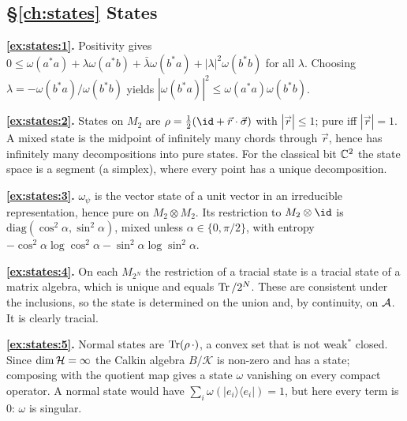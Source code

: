 {\subsection*{\S\ref{ch:states} States}
\textbf{\ref{ex:states:1}.} Positivity gives $0\le\omega(a^*a)+\lambda\omega(a^*b)+\bar\lambda\omega(b^*a)+|\lambda|^2\omega(b^*b)$ for all $\lambda$. Choosing $\lambda=-\omega(b^*a)/\omega(b^*b)$ yields $|\omega(b^*a)|^2\le\omega(a^*a)\omega(b^*b)$.\par
\textbf{\ref{ex:states:2}.} States on $M_2$ are $\rho=\frac12(\id+\vec r\cdot\vec\sigma)$ with $|\vec r|\le1$; pure iff $|\vec r|=1$. A mixed state is the midpoint of infinitely many chords through $\vec r$, hence has infinitely many decompositions into pure states. For the classical bit $\mathbb{C}^2$ the state space is a segment (a simplex), where every point has a unique decomposition.\par
\textbf{\ref{ex:states:3}.} $\omega_\psi$ is the vector state of a unit vector in an irreducible representation, hence pure on $M_2\otimes M_2$. Its restriction to $M_2\otimes\id$ is $\mathrm{diag}(\cos^2\alpha,\sin^2\alpha)$, mixed unless $\alpha\in\{0,\pi/2\}$, with entropy $-\cos^2\alpha\log\cos^2\alpha-\sin^2\alpha\log\sin^2\alpha$.\par
\textbf{\ref{ex:states:4}.} On each $M_{2^N}$ the restriction of a tracial state is a tracial state of a matrix algebra, which is unique and equals $\operatorname{Tr}/2^N$. These are consistent under the inclusions, so the state is determined on the union and, by continuity, on $\mathcal{A}$. It is clearly tracial.\par
\textbf{\ref{ex:states:5}.} Normal states are $\operatorname{Tr}(\rho\,\cdot)$, a convex set that is not weak$^*$ closed. Since $\dim\mathcal{H}=\infty$ the Calkin algebra $B/\mathcal K$ is non-zero and has a state; composing with the quotient map gives a state $\omega$ vanishing on every compact operator. A normal state would have $\sum_i\omega(|e_i\rangle\langle e_i|)=1$, but here every term is $0$: $\omega$ is singular.\par

}
